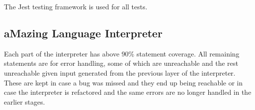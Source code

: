 The Jest \cite{jest} testing framework is used for all tests.

\subsection{aMazing Language Interpreter}

Each part of the interpreter has above 90\% statement coverage. All remaining statements are for error handling, some of which are unreachable and the rest unreachable given input generated from the previous layer of the interpreter. These are kept in case a bug was missed and they end up being reachable or in case the interpreter is refactored and the same errors are no longer handled in the earlier stages.
